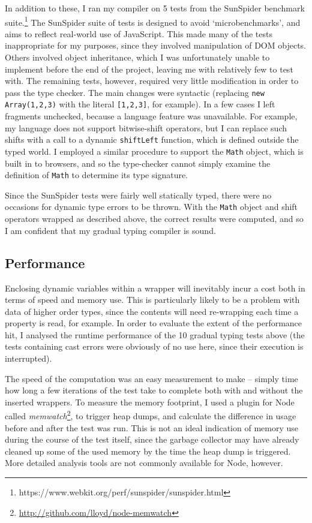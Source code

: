 \documentclass[12pt,a4paper,twoside,openright]{report}
\theoremstyle{definition}
\theoremstyle{dotless}
\newcommand*{\js}{\texttt}
\begin{document}
In addition to these, I ran my compiler on 5 tests from the SunSpider benchmark
suite.\footnote{https://www.webkit.org/perf/sunspider/sunspider.html} The
SunSpider suite of tests is designed to avoid `microbenchmarks', and aims to
reflect real-world use of JavaScript. This made many of the tests 
inappropriate for my purposes, since they involved manipulation of DOM objects.
Others involved object inheritance, which I was unfortunately unable to
implement before the end of the project, leaving me with relatively few to test
with. The remaining tests, however, required very little modification in order
to pass the type checker. The main
changes were syntactic (replacing \js{new Array(1,2,3)} with the literal
\js{[1,2,3]}, for example). In a few cases I left fragments unchecked, because
a language feature was unavailable. For example, my language does not
support bitwise-shift operators, but I can replace such shifts with a call to a
dynamic \js{shiftLeft} function, which is defined outside the typed world. I
employed a similar procedure to support the \js{Math} object, which is built in
to browsers, and so the type-checker cannot simply examine the definition of
\js{Math} to determine its type signature.

Since the SunSpider tests were fairly well statically typed, there were no
occasions for dynamic type errors to be thrown. With the \js{Math} object
and shift operators wrapped as described above, the correct results were
computed, and so I am confident that my gradual typing compiler is
sound.

\subsection*{Performance}

Enclosing dynamic variables within a wrapper will inevitably incur a cost both in
terms of speed and memory use. This is particularly likely to be a
problem with data of higher order types, since the contents will need
re-wrapping each time a property is read, for example. In order to evaluate the
extent of the performance hit, I analysed the runtime performance of the 10
gradual typing tests above (the tests containing cast errors were obviously
of no use here, since their execution is interrupted).

The speed of the computation was an easy measurement to make -- simply time how
long a few iterations of the test take to complete both with and without the
inserted wrappers. To measure the memory footprint, I used a plugin for Node
called \textit{memwatch}\footnote{\href{http://github.com/lloyd/node-memwatch}{http://github.com/lloyd/node-memwatch}},
to trigger heap dumps, and calculate the
difference in usage before and after the test was run. This is not an ideal
indication of memory use during the course of the test itself, since the
garbage collector may have already cleaned up some of the used memory by the
time the heap dump is triggered. More detailed analysis tools are not 
commonly available for Node, however.
\end{document}
